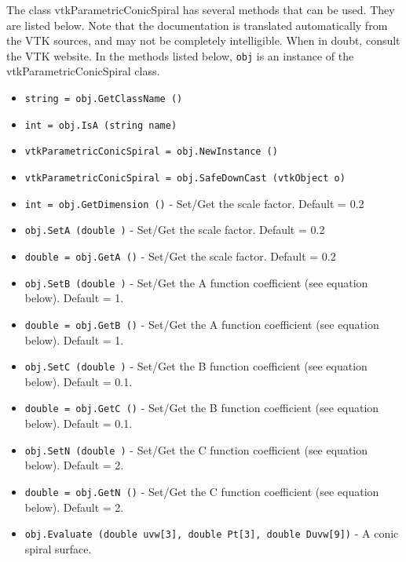 The class vtkParametricConicSpiral has several methods that can be used.
  They are listed below.
Note that the documentation is translated automatically from the VTK sources,
and may not be completely intelligible.  When in doubt, consult the VTK website.
In the methods listed below, \verb|obj| is an instance of the vtkParametricConicSpiral class.
\begin{itemize}
\item  \verb|string = obj.GetClassName ()|

\item  \verb|int = obj.IsA (string name)|

\item  \verb|vtkParametricConicSpiral = obj.NewInstance ()|

\item  \verb|vtkParametricConicSpiral = obj.SafeDownCast (vtkObject o)|

\item  \verb|int = obj.GetDimension ()| -  Set/Get the scale factor. 
 Default = 0.2

\item  \verb|obj.SetA (double )| -  Set/Get the scale factor. 
 Default = 0.2

\item  \verb|double = obj.GetA ()| -  Set/Get the scale factor. 
 Default = 0.2

\item  \verb|obj.SetB (double )| -  Set/Get the A function coefficient (see equation below). 
 Default = 1.

\item  \verb|double = obj.GetB ()| -  Set/Get the A function coefficient (see equation below). 
 Default = 1.

\item  \verb|obj.SetC (double )| -  Set/Get the B function coefficient (see equation below). 
 Default = 0.1.

\item  \verb|double = obj.GetC ()| -  Set/Get the B function coefficient (see equation below). 
 Default = 0.1.

\item  \verb|obj.SetN (double )| -  Set/Get the C function coefficient (see equation below). 
 Default = 2.

\item  \verb|double = obj.GetN ()| -  Set/Get the C function coefficient (see equation below). 
 Default = 2.

\item  \verb|obj.Evaluate (double uvw[3], double Pt[3], double Duvw[9])| -  A conic spiral surface.


\end{itemize}
